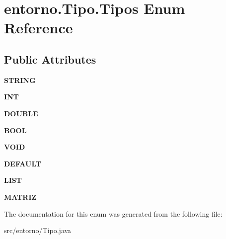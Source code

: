 \hypertarget{enumentorno_1_1_tipo_1_1_tipos}{}\section{entorno.\+Tipo.\+Tipos Enum Reference}
\label{enumentorno_1_1_tipo_1_1_tipos}
\subsection*{Public Attributes}
\begin{DoxyCompactItemize}
\item 
\mbox{\label{enumentorno_1_1_tipo_1_1_tipos_a897dd5c2009e0eaf6b60f826dbc8e2a7}} 
{\bfseries S\+T\+R\+I\+NG}
\item 
\mbox{\label{enumentorno_1_1_tipo_1_1_tipos_a5b247a6c9534e292a13e1d45cdeb3e29}} 
{\bfseries I\+NT}
\item 
\mbox{\label{enumentorno_1_1_tipo_1_1_tipos_a6fde90546e91983ac63b60a154672f02}} 
{\bfseries D\+O\+U\+B\+LE}
\item 
\mbox{\label{enumentorno_1_1_tipo_1_1_tipos_a1872240c69e6b247d8d4ee956a8b619b}} 
{\bfseries B\+O\+OL}
\item 
\mbox{\label{enumentorno_1_1_tipo_1_1_tipos_a8074f85e0811ec2a837f432738d781f1}} 
{\bfseries V\+O\+ID}
\item 
\mbox{\label{enumentorno_1_1_tipo_1_1_tipos_a32165ce9029d548e2faa25c0c0fda301}} 
{\bfseries D\+E\+F\+A\+U\+LT}
\item 
\mbox{\label{enumentorno_1_1_tipo_1_1_tipos_ad6b959b7441f58b43dfc1dadde9c668a}} 
{\bfseries L\+I\+ST}
\item 
\mbox{\label{enumentorno_1_1_tipo_1_1_tipos_a298ec6b9bf944ba4ffef6d3dd2293cfc}} 
{\bfseries M\+A\+T\+R\+IZ}
\end{DoxyCompactItemize}


The documentation for this enum was generated from the following file\+:\begin{DoxyCompactItemize}
\item 
src/entorno/Tipo.\+java\end{DoxyCompactItemize}
